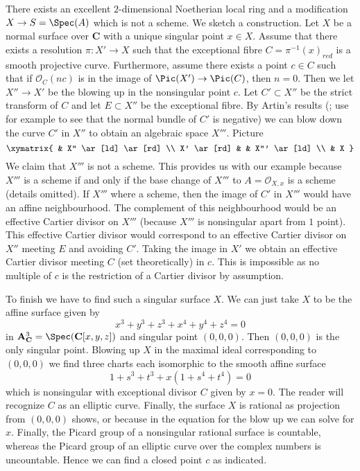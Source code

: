 \begin{example}
\label{example-not-blow-up}
There exists an excellent $2$-dimensional Noetherian local ring
and a modification $X \to S = \Spec(A)$ which is not a scheme.
We sketch a construction. Let $X$ be a normal surface over $\mathbf{C}$
with a unique singular point $x \in X$. Assume that there exists a
resolution $\pi : X' \to X$ such that the exceptional fibre
$C = \pi^{-1}(x)_{red}$ is a smooth projective curve. Furthermore, assume
there exists a point $c \in C$ such that if $\mathcal{O}_C(nc)$
is in the image of $\Pic(X') \to \Pic(C)$, then $n = 0$.
Then we let $X'' \to X'$ be the blowing up in the nonsingular point $c$.
Let $C' \subset X''$ be the strict transform of $C$ and let $E \subset X''$
be the exceptional fibre. By Artin's results
(\cite{ArtinII}; use for example \cite{Mumford-topology}
to see that the normal bundle of $C'$ is negative)
we can blow down the curve $C'$ in $X''$ to obtain an algebraic space $X'''$.
Picture
$$
\xymatrix{
& X'' \ar[ld] \ar[rd] \\
X' \ar[rd] &  & X''' \ar[ld] \\
& X
}
$$
We claim that $X'''$ is not a scheme. This provides us with our example
because $X'''$ is a scheme if and only if the base change of $X'''$
to $A = \mathcal{O}_{X, x}$ is a scheme (details omitted).
If $X'''$ where a scheme, then the image of $C'$ in $X'''$ would
have an affine neighbourhood. The complement of this neighbourhood
would be an effective Cartier divisor on $X'''$ (because $X'''$ is
nonsingular apart from $1$ point). This effective Cartier divisor would
correspond to an effective Cartier divisor on $X''$
meeting $E$ and avoiding $C'$. Taking the image in $X'$ we obtain
an effective Cartier divisor meeting $C$ (set theoretically) in $c$.
This is impossible as no multiple of $c$ is the restriction of a Cartier
divisor by assumption.

\medskip\noindent
To finish we have to find such a singular surface $X$. We can just take
$X$ to be the affine surface given by
$$
x^3 + y^3 + z^3 + x^4 + y^4 + z^4 = 0
$$
in $\mathbf{A}^3_\mathbf{C} = \Spec(\mathbf{C}[x, y, z])$ and singular point
$(0, 0, 0)$. Then $(0, 0, 0)$ is the only singular point. Blowing up $X$
in the maximal ideal corresponding to $(0, 0, 0)$ we find three charts each
isomorphic to the smooth affine surface
$$
1 + s^3 + t^3 + x(1 + s^4 + t^4) = 0
$$
which is nonsingular with exceptional divisor $C$ given by $x = 0$. The reader
will recognize $C$ as an elliptic curve. Finally, the surface $X$ is rational
as projection from $(0, 0, 0)$ shows, or because in the equation for the
blow up we can solve for $x$. Finally, the Picard group of a nonsingular
rational surface is countable, whereas the Picard group of an elliptic
curve over the complex numbers is uncountable. Hence we can find a closed
point $c$ as indicated.
\end{example}














